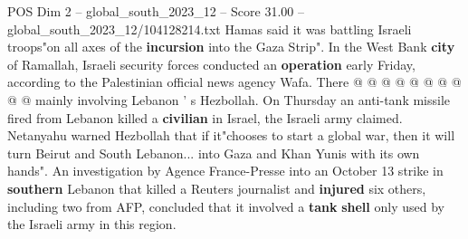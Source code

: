 \begin{textsample}{POS Dim 2 – global\_south\_2023\_12 – Score 31.00 – global\_south\_2023\_12/104128214.txt}
Hamas said it was battling Israeli troops"on all axes of the \textbf{incursion} into the Gaza Strip".
In the West Bank \textbf{city} of Ramallah, Israeli security forces conducted an \textbf{operation} early Friday, according to the Palestinian official news agency Wafa.
There @ @ @ @ @ @ @ @ @ @ mainly involving Lebanon ' s Hezbollah.
On Thursday an anti-tank missile fired from Lebanon killed a \textbf{civilian} in Israel, the Israeli army claimed.
Netanyahu warned Hezbollah that if it"chooses to start a global war, then it will turn Beirut and South Lebanon... into Gaza and Khan Yunis with its own hands".
An investigation by Agence France-Presse into an October 13 strike in \textbf{southern} Lebanon that killed a Reuters journalist and \textbf{injured} six others, including two from AFP, concluded that it involved a \textbf{tank} \textbf{shell} only used by the Israeli army in this region.

\end{textsample}
